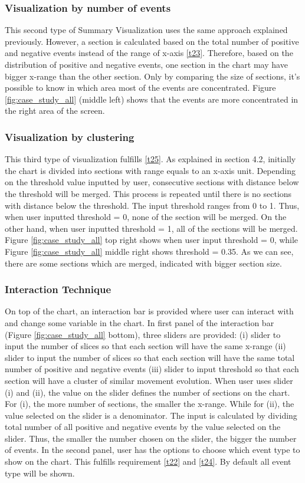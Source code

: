 \documentclass{vgtc}                          %
\begin{document}
\subsubsection{Visualization by number of events}
This second type of Summary Visualization uses the same approach explained previously. However, a section is calculated based on the total number of positive and negative events instead of the range of x-axis \ref{t23}. Therefore, based on the distribution of positive and negative events, one section in the chart may have bigger x-range than the other section. Only by comparing the size of sections, it's possible to know in which area most of the events are concentrated. Figure \ref{fig:case_study_all} (middle left) shows that the events are more concentrated in the right area of the screen. 

\subsubsection{Visualization by clustering}
This third type of visualization fulfills \ref{t25}. As explained in section 4.2, initially the chart is divided into sections with range equals to an x-axis unit. Depending on the threshold value inputted by user, consecutive sections with distance below the threshold will be merged. This process is repeated until there is no sections with distance below the threshold. The input threshold ranges from 0 to 1. Thus, when user inputted threshold = 0, none of the section will be merged. On the other hand, when user inputted threshold = 1, all of the sections will be merged. Figure \ref{fig:case_study_all} top right shows when user input threshold = 0, while Figure \ref{fig:case_study_all} middle right shows threshold = 0.35. As we can see, there are some sections which are merged, indicated with bigger section size. 

\subsubsection{Interaction Technique}
On top of the chart, an interaction bar is provided where user can interact with and change some variable in the chart. In first panel of the interaction bar (Figure \ref{fig:case_study_all} bottom), three sliders are provided: (i) slider to input the number of slices so that each section will have the same x-range (ii) slider to input the number of slices so that each section will have the same total number of positive and negative events (iii) slider to input threshold so that each section will have a cluster of similar movement evolution. When user uses slider (i) and (ii), the value on the slider defines the number of sections on the chart. For (i), the more number of sections, the smaller the x-range. While for (ii), the value selected on the slider is a denominator. The input is calculated by dividing total number of all positive and negative events by the value selected on the slider. Thus, the smaller the number chosen on the slider, the bigger the number of events. In the second panel, user has the options to choose which event type to show on the chart. This fulfills requirement \ref{t22} and \ref{t24}. By default all event type will be shown. 
\end{document}
